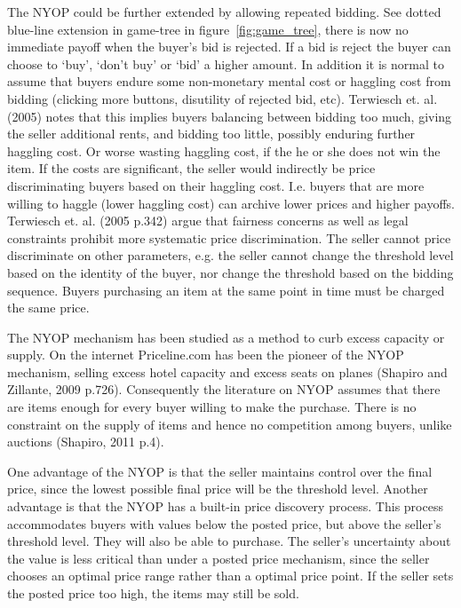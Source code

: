 \documentclass[a4paper,12pt]{article}
\begin{document}
	The NYOP could be further extended by allowing repeated bidding. See dotted blue-line extension in game-tree in figure~\ref{fig:game_tree}, there is now no immediate payoff when the buyer's bid is rejected. If a bid is reject the buyer can choose to `buy', `don't buy' or `bid' a higher amount. In addition it is normal to assume that buyers endure some non-monetary mental cost or haggling cost from bidding (clicking more buttons, disutility of rejected bid, etc). Terwiesch et. al. (2005) notes that this implies buyers balancing between bidding too much, giving the seller additional rents, and bidding too little, possibly enduring further haggling cost. Or worse wasting haggling cost, if the he or she does not win the item. If the costs are significant, the seller would indirectly be price discriminating buyers based on their haggling cost. I.e. buyers that are more willing to haggle (lower haggling cost) can archive lower prices and higher payoffs. Terwiesch et. al. (2005 p.342) argue that fairness concerns as well as legal constraints prohibit more systematic price discrimination. The seller cannot price discriminate on other parameters, e.g. the seller cannot change the threshold level based on the identity of the buyer, nor change the threshold based on the bidding sequence. Buyers purchasing an item at the same point in time must be charged the same price.

	The NYOP mechanism has been studied as a method to curb excess capacity or supply. On the internet Priceline.com has been the pioneer of the NYOP mechanism, selling excess hotel capacity and excess seats on planes (Shapiro and Zillante, 2009 p.726). Consequently the literature on NYOP assumes that there are items enough for every buyer willing to make the purchase. There is no constraint on the supply of items and hence no competition among buyers, unlike auctions (Shapiro, 2011 p.4).

	One advantage of the NYOP is that the seller maintains control over the final price, since the lowest possible final price will be the threshold level. Another advantage is that the NYOP has a built-in price discovery process. This process accommodates buyers with values below the posted price, but above the seller's threshold level. They will also be able to purchase. The seller's uncertainty about the value is less critical than under a posted price mechanism, since the seller chooses an optimal price range rather than a optimal price point. If the seller sets the posted price too high, the items may still be sold.
\end{document}
